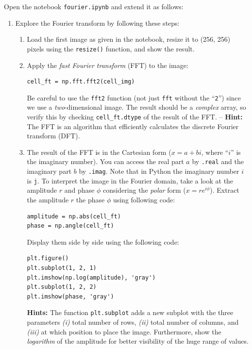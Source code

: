 \documentclass[12pt,a4paper]{article}
\begin{document}

\noindent
Open the notebook \texttt{fourier.ipynb} and extend it as follows:

\begin{enumerate}
\item Explore the Fourier transform by following these steps:
\begin{enumerate}
    \item Load the first image as given in the notebook, resize it to (256, 256) pixels using the \texttt{resize()} function, and show the result.
    \item Apply the \emph{fast Fourier transform} (FFT) to the image:
    \begin{Verbatim}[frame=single]
cell_ft = np.fft.fft2(cell_img)
    \end{Verbatim}
    Be careful to use the \texttt{fft2} function (not just \texttt{fft} without the ``\texttt{2}'') since we use a \emph{two}-dimensional image. The result should be a \emph{complex} array, so verify this by checking \texttt{cell\_ft.dtype} of the result of the FFT. -- \textbf{Hint:} The FFT is an algorithm that efficiently calculates the discrete Fourier transform (DFT).
    \item The result of the FFT is in the Cartesian form ($x = a + bi$, where ``$i$'' is the imaginary number). You can access the real part $a$ by \texttt{.real} and the imaginary part $b$ by \texttt{.imag}. Note that in Python the imaginary number $i$ is \texttt{j}. To interpret the image in the Fourier domain, take a look at the amplitude $r$ and phase $\phi$ considering the \emph{polar} form ($x = re^{i\phi}$). Extract the amplitude $r$ the phase $\phi$ using following code:
    \begin{Verbatim}[frame=single]
amplitude = np.abs(cell_ft)
phase = np.angle(cell_ft)
    \end{Verbatim}
    Display them side by side using the following code:
    \begin{Verbatim}[frame=single]
plt.figure()
plt.subplot(1, 2, 1)
plt.imshow(np.log(amplitude), 'gray')
plt.subplot(1, 2, 2)
plt.imshow(phase, 'gray')
    \end{Verbatim}
    \textbf{Hints:} The function \texttt{plt.subplot} adds a new subplot with the three parameters \textit{(i)} total number of rows, \textit{(ii)} total number of columns, and \textit{(iii)} at which position to place the image. Furthermore, show the \emph{logarithm} of the amplitude for better visibility of the huge range of values.

\end{enumerate}
\end{enumerate}
\end{document}
